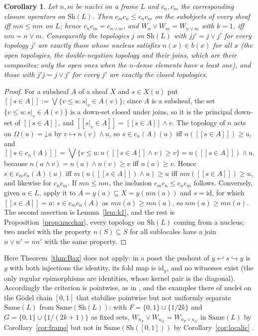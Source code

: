 \documentclass[11pt]{amsart}
\newtheorem{cor}[thm]{Corollary}
\theoremstyle{definition}
\newcommand{\Same}{\mathrm{Same}}
\newcommand{\tv}[1]{[\![#1]\!]}
\newcommand{\Sh}{\mathrm{Sh}}
\begin{document}
\begin{cor}\label{cor:localick1}
Let $n,m$ be nuclei on a frame $L$ and $c_n,c_m$ the corresponding closure
operators on $\Sh(L)$. Then $c_mc_n\le c_nc_m$ on the subobjects of every
sheaf iff $mn\le nm$ on $L$; hence $c_nc_m=c_{n\vee m}$, and $W_n\vee W_m=
W_{n\vee m}$ with $k=1$, iff $nm=n\vee m$. Consequently the topologies $j$
on $\Sh(L)$ with $jj'=j\vee j'$ for every topology $j'$ are exactly those
whose nucleus satisfies $n(x)\in b(x)$ for all $x$ (the open topologies,
the double-negation topology and their joins, which are their composites;
only the open ones when the $n$-dense elements have a least one), and
those with $j'j=j\vee j'$ for every $j'$ are exactly the closed
topologies.
\end{cor}
\begin{proof}
For a subsheaf $A$ of a sheaf $X$ and $s\in X(u)$ put $\tv{s\in A}:=\bigvee\{v\le u:s|_v\in A(v)\}$; since $A$ is a subsheaf, the
set $\{v\le u:s|_v\in A(v)\}$ is a down-set closed under joins, so it is
the principal down-set of $\tv{s\in A}$, and $\tv{s|_v\in A}=\tv{s\in A}\wedge v$. The topology of
$n$ acts on $\Omega(u)=\mathord\downarrow u$ by $v\mapsto n(v)\wedge u$, so
$s\in c_n(A)(u)$ iff $n(\tv{s\in A})\ge u$, and
\[
\tv{s\in c_n(A)}=\bigvee\{v\le u:n(\tv{s\in A}\wedge v)\ge v\}=n(\tv{s\in A})\wedge u,
\]
because $n(a\wedge v)=n(a)\wedge n(v)\ge v$ iff $n(a)\ge v$. Hence $s\in
c_mc_n(A)(u)$ iff $m(n(\tv{s\in A})\wedge u)\ge u$ iff
$mn(\tv{s\in A})\ge u$, and likewise for $c_nc_m$. If $mn\le
nm$, the inclusion $c_mc_n\le c_nc_m$ follows. Conversely, given $a\in L$,
apply it to $A=y(a)\subseteq X=y(mn(a))$ and $s=\mathrm{id}$, for which
$\tv{s\in A}=a$: $s\in c_mc_n(A)$ as $mn(a)\ge mn(a)$, so
$nm(a)\ge mn(a)$. The second assertion is Lemma~\ref{lem:k1}, and the rest
is Proposition~\ref{prop:nucchar}, every topology on $\Sh(L)$ coming from a
nucleus; two nuclei with the property $n(S)\subseteq S$ for all sublocales
have a join $n\vee n'=nn'$ with the same property.
\end{proof}

Here Theorem~\ref{thm:Bax} does not apply: in a poset the pushout of
$y\hookleftarrow s\hookrightarrow y$ is $y$ with both injections the identity,
its fold map is $\mathrm{id}_y$, and no witnesses exist (the only regular
epimorphisms are identities, whose kernel pair is the diagonal). Accordingly the criterion is pointwise, as in
\cite[Thm.~1.1]{Fuzzysame}, and the examples there of nuclei on the
G\"odel chain $[0,1]$ that stabilise pointwise but not uniformly separate
$\Same(L)$ from $\Same(\Sh(L))$: with $F=\{0,1\}\cup\{1/2k\}$ and
$G=\{0,1\}\cup\{1/(2k+1)\}$ as fixed sets, $W_{n_F}\vee W_{n_G}=W_{n_F\vee
n_G}$ in $\Same(L)$ by Corollary~\ref{cor:frame} but not in
$\Same(\Sh([0,1]))$ by Corollary~\ref{cor:localic} \cite[Ex.~7.4]{Stabjoin}.
\end{document}
